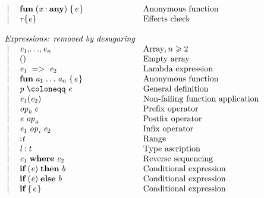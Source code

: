 \documentclass[acmsmall,screen]{acmart}\settopmatter{}
\newcommand{\Varid}[1]{\mathit{#1}}
\renewcommand{\geq}{\geqslant}
\newcommand{\vb}{\; \ensuremath{\mathop{\mid}} \;}
\newenvironment{figurebox}{\begin{figure}\begin{framed}}{\end{framed}\end{figure}}
\begin{document}
\begin{figurebox}
$$\begin{array}{rcll}
      & \vb & \ensuremath{\textbf{fun}\;(\Varid{x}\mathbin{:}\textbf{any})\;\{\mskip1.5mu \Varid{e}\mskip1.5mu\}}    & \text{Anonymous function} \\
      & \vb & \ensuremath{\Varid{r}\{\Varid{e}\}}     & \text{Effects check} \\
  \\
      & \multicolumn{2}{l}{\textit{Expressions: removed by desugaring}} \\
      & \vb & \ensuremath{\Varid{e}_{\mathrm{1}},\!\ldots\!,\Varid{e}_{\Varid{n}}}  & \text{Array}, n \geq 2 \\
      & \vb & \ensuremath{()}              & \text{Empty array} \\
      & \vb & \ensuremath{\Varid{e}_{\mathrm{1}}\;=>\;\Varid{e}_{\mathrm{2}}}    & \text{Lambda expression} \\
      & \vb & \ensuremath{\textbf{fun}\;\Varid{a}_{\mathrm{1}}\;\!\ldots\!\;\Varid{a}_{\Varid{n}}\;\{\mskip1.5mu \Varid{e}\mskip1.5mu\}}    & \text{Anonymous function} \\
      & \vb & \ensuremath{\Varid{p}\mathrel{\coloneqq}\Varid{e}}          & \text{General definition} \\
      & \vb & \ensuremath{\Varid{e}_{\mathrm{1}} (\Varid{e}_{\mathrm{2}})}       & \text{Non-failing function application} \\
      & \vb & \ensuremath{\Varid{op}_{\Varid{b}}\;\Varid{e}}          & \text{Prefix operator} \\
      & \vb & \ensuremath{\Varid{e}\;\Varid{op}_{\Varid{a}}}          & \text{Postfix operator} \\
      & \vb & \ensuremath{\Varid{e}_{\mathrm{1}}\;\Varid{op}_{\Varid{i}}\;\Varid{e}_{\mathrm{2}}}    & \text{Infix operator} \\
      & \vb & \ensuremath{\mathbin{:}\Varid{t}}             & \text{Range} \\
      & \vb & \ensuremath{\Varid{l}\mathbin{:}\Varid{t}}           & \text{Type ascription} \\
      & \vb & \ensuremath{\Varid{e}_{\mathrm{1}}\;\mathbf{where}\;\Varid{e}_{\mathrm{2}}}   & \text{Reverse sequencing} \\
      & \vb & \ensuremath{\textbf{if}\;(\Varid{e})\;\textbf{then}\;\Varid{b}}    & \text{Conditional expression} \\
      & \vb & \ensuremath{\textbf{if}\;(\Varid{e})\;\textbf{else}\;\Varid{b}}    & \text{Conditional expression} \\
      & \vb & \ensuremath{\textbf{if}\;\{\mskip1.5mu \Varid{e}\mskip1.5mu\}}           & \text{Conditional expression} \\

\end{array}$$
\end{figurebox}
\end{document}
